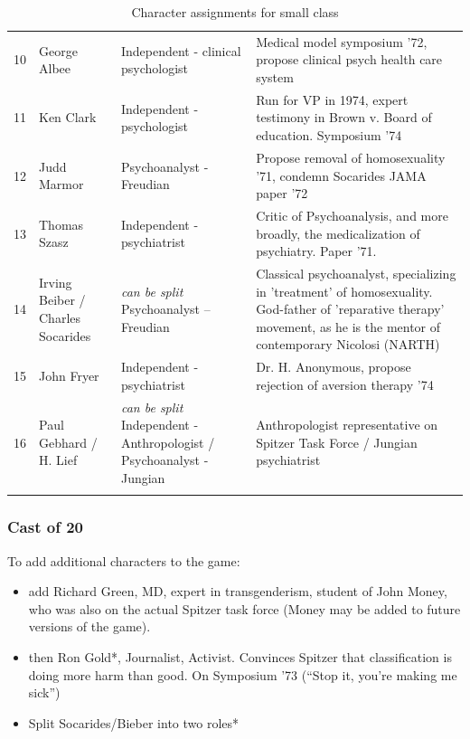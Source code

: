 \begin{refsection}
\begin{longtable}[!t]{ | p{0.6cm} | P{3.4cm} | P{5cm} | P{6.5cm} | }
10&
George Albee&
Independent  - clinical psychologist&
Medical model symposium '72, propose clinical psych health care system \\
11&
Ken Clark&
Independent - psychologist&
Run for VP in 1974, expert testimony in Brown v. Board of education. Symposium '74\\
12&
Judd Marmor&
Psychoanalyst - Freudian&
Propose removal of homosexuality '71, condemn Socarides JAMA paper '72\\
13&
Thomas Szasz&
Independent - psychiatrist&
Critic of Psychoanalysis, and more broadly, the medicalization of psychiatry. Paper '71.\\
14&
Irving Beiber / Charles Socarides&
\emph{can be split} \newline
Psychoanalyst – Freudian&
Classical psychoanalyst, specializing in 'treatment' of homosexuality. God-father of 'reparative therapy' movement, as he is the mentor of contemporary Nicolosi (NARTH) \\
15&
John Fryer&
Independent - psychiatrist&
Dr. H. Anonymous, propose rejection of aversion therapy '74\\
16&
Paul Gebhard / H. Lief&
\emph{can be split}\newline
Independent - Anthropologist / Psychoanalyst - Jungian&
Anthropologist representative on Spitzer Task Force / Jungian psychiatrist\\ \hline

\caption{Character assignments for small class}
\label{table: charactersmall}
\end{longtable}

\subsubsection{Cast of 20}
\label{castof20}

To add additional characters to the game:

\begin{itemize}
\item add Richard Green, MD, expert in transgenderism, student of John Money, who was also on the actual Spitzer task force (Money may be added to future versions of the game).

\item then Ron Gold*, Journalist, Activist. Convinces Spitzer that classification is doing more harm than good. On Symposium '73 (``Stop it, you're making me sick'')

\item Split Socarides\slash  Bieber into two roles*


\end{itemize}
\end{refsection}
